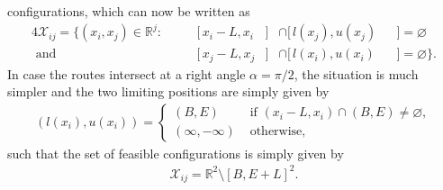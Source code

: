 \documentclass[a4paper]{report}
\theoremstyle{definition}
\theoremstyle{plain}
\begin{document}
configurations, which can now be written as
\begin{alignat}{4}
  \mathcal{X}_{ij} = \{ (x_{i}, x_{j}) \in \mathbb{R}^{j} :& \; &&[\,x_{i} - L,x_{i} &]& \cap [\,l(x_{j}), u(x_{j}) &&] = \varnothing \\
  \text{ and } & \, &&[\,x_{j} - L, x_{j} &]& \cap [\,l(x_{i}), u(x_{i}) &&] = \varnothing \} .
\end{alignat}
%
In case the routes intersect at a right angle $\alpha = \pi / 2$, the situation
is much simpler and the two limiting positions are simply given by
\begin{align}
  (l(x_{i}), u(x_{i})) =
  \begin{cases}
    (B,  E)    &\text{ if } (x_{i} - L, x_{i}) \cap (B, E) \neq \varnothing , \\
    (\infty, -\infty) &\text{ otherwise, }
  \end{cases}
\end{align}
such that the set of feasible configurations is simply given by
\begin{align}
  \mathcal{X}_{ij} = \mathbb{R}^{2} \setminus [B,E + L]^{2} .
\end{align}
\end{document}
